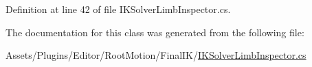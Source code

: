 Definition at line 42 of file I\+K\+Solver\+Limb\+Inspector.\+cs.



The documentation for this class was generated from the following file\+:\begin{DoxyCompactItemize}
\item 
Assets/\+Plugins/\+Editor/\+Root\+Motion/\+Final\+I\+K/\mbox{\hyperlink{_i_k_solver_limb_inspector_8cs}{I\+K\+Solver\+Limb\+Inspector.\+cs}}\end{DoxyCompactItemize}
